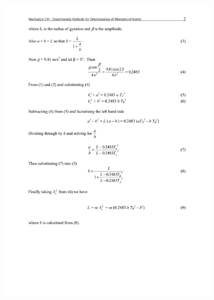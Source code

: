\documentclass[12pt,a4paper]{report}
\begin{document}
\begin{figure}
 \includegraphics[width=\linewidth]{lab1/lab1-2}
  \caption*{}
\label{}
\end{figure}
\end{document}
